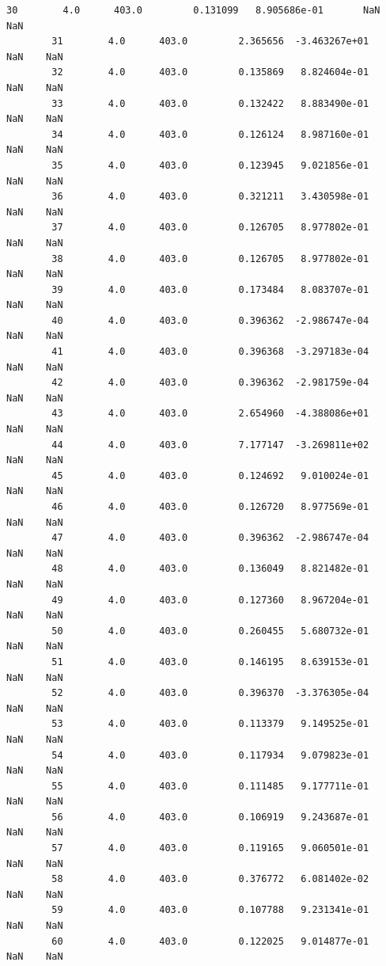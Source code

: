 \documentclass[11pt, a4paper , landscape]{article}
\begin{document}
\begin{Verbatim}[commandchars=\\\{\}]
        30        4.0      403.0         0.131099   8.905686e-01       NaN    NaN  
        31        4.0      403.0         2.365656  -3.463267e+01       NaN    NaN  
        32        4.0      403.0         0.135869   8.824604e-01       NaN    NaN  
        33        4.0      403.0         0.132422   8.883490e-01       NaN    NaN  
        34        4.0      403.0         0.126124   8.987160e-01       NaN    NaN  
        35        4.0      403.0         0.123945   9.021856e-01       NaN    NaN  
        36        4.0      403.0         0.321211   3.430598e-01       NaN    NaN  
        37        4.0      403.0         0.126705   8.977802e-01       NaN    NaN  
        38        4.0      403.0         0.126705   8.977802e-01       NaN    NaN  
        39        4.0      403.0         0.173484   8.083707e-01       NaN    NaN  
        40        4.0      403.0         0.396362  -2.986747e-04       NaN    NaN  
        41        4.0      403.0         0.396368  -3.297183e-04       NaN    NaN  
        42        4.0      403.0         0.396362  -2.981759e-04       NaN    NaN  
        43        4.0      403.0         2.654960  -4.388086e+01       NaN    NaN  
        44        4.0      403.0         7.177147  -3.269811e+02       NaN    NaN  
        45        4.0      403.0         0.124692   9.010024e-01       NaN    NaN  
        46        4.0      403.0         0.126720   8.977569e-01       NaN    NaN  
        47        4.0      403.0         0.396362  -2.986747e-04       NaN    NaN  
        48        4.0      403.0         0.136049   8.821482e-01       NaN    NaN  
        49        4.0      403.0         0.127360   8.967204e-01       NaN    NaN  
        50        4.0      403.0         0.260455   5.680732e-01       NaN    NaN  
        51        4.0      403.0         0.146195   8.639153e-01       NaN    NaN  
        52        4.0      403.0         0.396370  -3.376305e-04       NaN    NaN  
        53        4.0      403.0         0.113379   9.149525e-01       NaN    NaN  
        54        4.0      403.0         0.117934   9.079823e-01       NaN    NaN  
        55        4.0      403.0         0.111485   9.177711e-01       NaN    NaN  
        56        4.0      403.0         0.106919   9.243687e-01       NaN    NaN  
        57        4.0      403.0         0.119165   9.060501e-01       NaN    NaN  
        58        4.0      403.0         0.376772   6.081402e-02       NaN    NaN  
        59        4.0      403.0         0.107788   9.231341e-01       NaN    NaN  
        60        4.0      403.0         0.122025   9.014877e-01       NaN    NaN  

\end{Verbatim}
\end{document}
